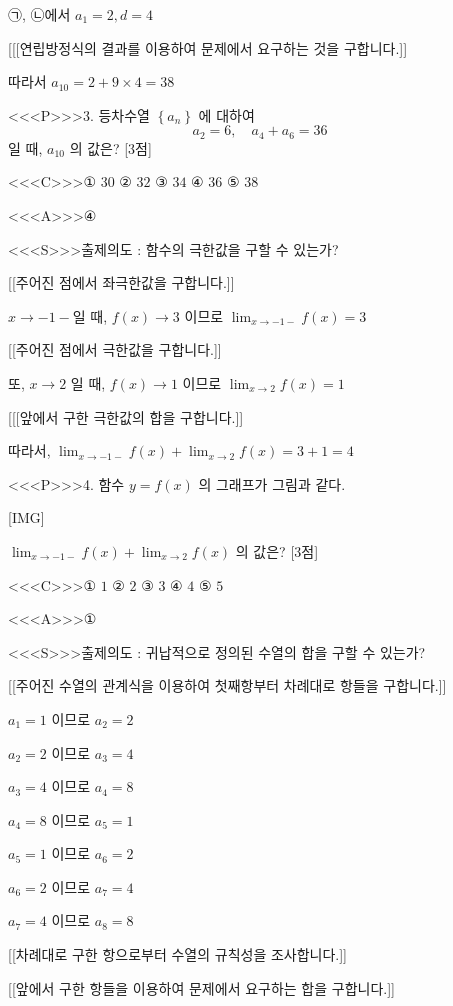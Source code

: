 \documentclass{oblivoir}
\begin{document}
㉠, ㉡에서
$a_{1}=2, d=4$

[[[연립방정식의 결과를 이용하여 문제에서 요구하는 것을 구합니다.]]

따라서
$a_{10}=2+9 \times 4=38$

<<<P>>>3. 등차수열 $\left\{a_{n}\right\}$ 에 대하여
$$
a_{2}=6, \quad a_{4}+a_{6}=36
$$
일 때, $a_{10}$ 의 값은? [3점]

<<<C>>>① $30$
② $32$
③ $34$
④ $36$
⑤ $38$

<<<A>>>④

<<<S>>>출제의도 : 함수의 극한값을 구할 수 있는가?

[[주어진 점에서 좌극한값을 구합니다.]]

$x \rightarrow-1-$일 때, $f(x) \rightarrow 3$ 이므로 $\displaystyle\lim _{x \rightarrow-1-} f(x)=3$

[[주어진 점에서 극한값을 구합니다.]]

또, $x \rightarrow 2$ 일 때, $f(x) \rightarrow 1$ 이므로 $\displaystyle\lim _{x \rightarrow 2} f(x)=1$

[[[앞에서 구한 극한값의 합을 구합니다.]]

따라서,
$\displaystyle\lim _{x \rightarrow-1-} f(x)+\displaystyle\lim _{x \rightarrow 2} f(x)=3+1=4$

<<<P>>>4. 함수 $y=f(x)$ 의 그래프가 그림과 같다.

[IMG]

$\displaystyle\lim _{x \rightarrow-1-} f(x)+\displaystyle\lim _{x \rightarrow 2} f(x)$ 의 값은? [3점]

<<<C>>>① $1$
② $2$
③ $3$
④ $4$
⑤ $5$

<<<A>>>①

<<<S>>>출제의도 : 귀납적으로 정의된 수열의 합을 구할 수 있는가?


[[주어진 수열의 관계식을 이용하여 첫째항부터 차례대로 항들을 구합니다.]]

$a_{1}=1$ 이므로 $a_{2}=2$

$a_{2}=2$ 이므로 $a_{3}=4$

$a_{3}=4$ 이므로 $a_{4}=8$

$a_{4}=8$ 이므로 $a_{5}=1$

$a_{5}=1$ 이므로 $a_{6}=2$

$a_{6}=2$ 이므로 $a_{7}=4$

$a_{7}=4$ 이므로 $a_{8}=8$

[[차례대로 구한 항으로부터 수열의 규칙성을 조사합니다.]]

[[앞에서 구한 항들을 이용하여 문제에서 요구하는 합을 구합니다.]]
\end{document}
